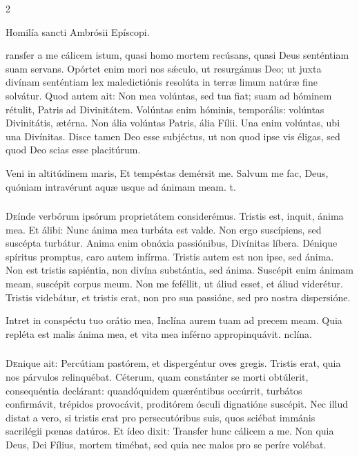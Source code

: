 \documentclass[9pt,twoside]{extarticle}
\begin{document}
\begin{multicols}{2}
\begin{center} Homilía sancti Ambrósii Epíscopi.\\
\end{center}
ransfer a me cálicem istum, quasi homo mortem recúsans, quasi Deus senténtiam suam servans. Opórtet enim mori nos sǽculo, ut resurgámus Deo; ut juxta divínam senténtiam lex maledictiónis resolúta in terræ limum natúræ fine solvátur. Quod autem ait: Non mea volúntas, sed tua fiat; suam ad hóminem rétulit, Patris ad Divinitátem. Volúntas enim hóminis, temporális: volúntas Divinitátis, ætérna. Non ália volúntas Patris, ália Fílii. Una enim volúntas, ubi una Divínitas. Disce tamen Deo esse subjéctus, ut non quod ipse vis éligas, sed quod Deo scias esse placitúrum.

\begin{tightlist}{}
\item {} Veni in altitúdinem maris, \textred{*} Et tempéstas demérsit me.  Salvum me fac, Deus, quóniam intravérunt aquæ usque ad ánimam meam. t.
\end{tightlist}

\subsubsection*{\center{}}
\lettrine{D}eínde verbórum ipsórum proprietátem considerémus. Tristis est, inquit, ánima mea. Et álibi: Nunc ánima mea turbáta est valde. Non ergo suscípiens, sed suscépta turbátur. Anima enim obnóxia passiónibus, Divínitas líbera. Dénique spíritus promptus, caro autem infírma. Tristis autem est non ipse, sed ánima. Non est tristis sapiéntia, non divína substántia, sed ánima. Suscépit enim ánimam meam, suscépit corpus meum. Non me feféllit, ut áliud esset, et áliud viderétur. Tristis videbátur, et tristis erat, non pro sua passióne, sed pro nostra dispersióne.

\begin{tightlist}{}
\item {} Intret in conspéctu tuo orátio mea, \textred{*} Inclína aurem tuam ad precem meam.  Quia repléta est malis ánima mea, et vita mea inférno appropinquávit. nclína.
\end{tightlist}

\subsubsection*{\center{}}
\lettrine{D}enique ait: Percútiam pastórem, et dispergéntur oves gregis. Tristis erat, quia nos párvulos relinquébat. Céterum, quam constánter se morti obtúlerit, consequéntia declárant: quandóquidem quæréntibus occúrrit, turbátos confirmávit, trépidos provocávit, proditórem ósculi dignatióne suscépit. Nec illud distat a vero, si tristis erat pro persecutóribus suis, quos sciébat immánis sacrilégii pœnas datúros. Et ídeo dixit: Transfer hunc cálicem a me. Non quia Deus, Dei Fílius, mortem timébat, sed quia nec malos pro se períre volébat.


\end{multicols}
\end{document}
